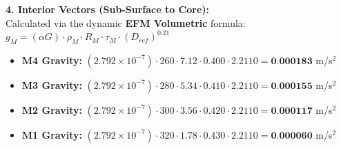 \documentclass[11pt, a4paper]{article}
\begin{document}
  \vspace{0.5em}
  \noindent \textbf{4. Interior Vectors (Sub-Surface to Core):} \\[0.5em]
  \hspace*{1em} Calculated via the dynamic \textbf{EFM Volumetric} formula: $g_M = (\alpha G) \cdot \rho_{M} \cdot R_M \cdot \tau_M \cdot (D_{ref})^{0.21}$
  \begin{itemize}
    \item \textbf{M4 Gravity:} $(2.792 \times 10^{-7}) \cdot 260 \cdot 7.12 \cdot 0.400 \cdot 2.2110 = \textbf{0.000183}$ m/s$^2$
    \item \textbf{M3 Gravity:} $(2.792 \times 10^{-7}) \cdot 280 \cdot 5.34 \cdot 0.410 \cdot 2.2110 = \textbf{0.000155}$ m/s$^2$
    \item \textbf{M2 Gravity:} $(2.792 \times 10^{-7}) \cdot 300 \cdot 3.56 \cdot 0.420 \cdot 2.2110 = \textbf{0.000117}$ m/s$^2$
    \item \textbf{M1 Gravity:} $(2.792 \times 10^{-7}) \cdot 320 \cdot 1.78 \cdot 0.430 \cdot 2.2110 = \textbf{0.000060}$ m/s$^2$
  \end{itemize}
\end{document}
